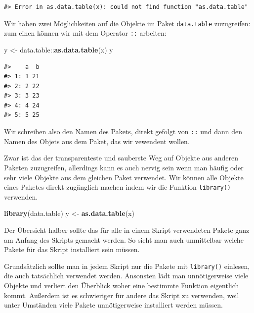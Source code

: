\documentclass[]{tufte-book}
\newenvironment{Shaded}{}{}
\newcommand{\KeywordTok}[1]{\textcolor[rgb]{0.00,0.44,0.13}{\textbf{#1}}}
\newcommand{\StringTok}[1]{\textcolor[rgb]{0.25,0.44,0.63}{#1}}
\newcommand{\OperatorTok}[1]{\textcolor[rgb]{0.40,0.40,0.40}{#1}}
\newcommand{\NormalTok}[1]{#1}
\begin{document}
\begin{verbatim}
#> Error in as.data.table(x): could not find function "as.data.table"
\end{verbatim}

Wir haben zwei Möglichkeiten auf die Objekte im Paket
\texttt{data.table} zuzugreifen: zum einen können wir mit dem Operator
\texttt{::} arbeiten:

\begin{Shaded}
\begin{Highlighting}[]
\NormalTok{y <-}\StringTok{ }\NormalTok{data.table}\OperatorTok{::}\KeywordTok{as.data.table}\NormalTok{(x)}
\NormalTok{y}
\end{Highlighting}
\end{Shaded}

\begin{verbatim}
#>    a  b
#> 1: 1 21
#> 2: 2 22
#> 3: 3 23
#> 4: 4 24
#> 5: 5 25
\end{verbatim}

Wir schreiben also den Namen des Pakets, direkt gefolgt von \texttt{::}
und dann den Namen des Objets aus dem Paket, das wir vewendent wollen.

Zwar ist das der transparenteste und sauberste Weg auf Objekte aus
anderen Paketen zuzugreifen, allerdings kann es auch nervig sein wenn
man häufig oder sehr viele Objekte aus dem gleichen Paket verwendet. Wir
können alle Objekte eines Paketes direkt zugänglich machen indem wir die
Funktion \texttt{library()} verwenden.

\begin{Shaded}
\begin{Highlighting}[]
\KeywordTok{library}\NormalTok{(data.table)}
\NormalTok{y <-}\StringTok{ }\KeywordTok{as.data.table}\NormalTok{(x)}
\end{Highlighting}
\end{Shaded}

Der Übersicht halber sollte das für alle in einem Skript verwendeten
Pakete ganz am Anfang des Skripts gemacht werden. So sieht man auch
unmittelbar welche Pakete für das Skript installiert sein müssen.

Grundsätzlich sollte man in jedem Skript nur die Pakete mit
\texttt{library()} einlesen, die auch tatsächlich verwendet werden.
Ansonsten lädt man unnötigerweise viele Objekte und verliert den
Überblick woher eine bestimmte Funktion eigentlich kommt. Außerdem ist
es schwieriger für andere das Skript zu verwenden, weil unter Umständen
viele Pakete unnötigerweise installiert werden müssen.
\end{document}
